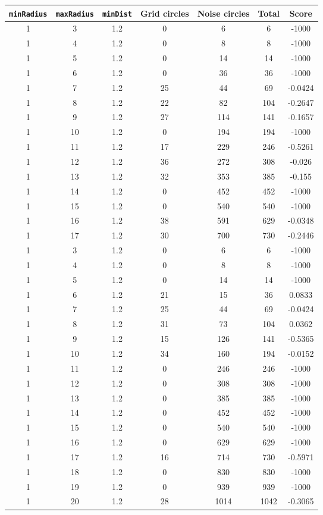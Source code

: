 \documentclass[letterpaper, 12pt]{article}
\begin{document}
\begin{longtable}{|c|c|c|c|c|c|c|}
\hline
\textbf{\texttt{minRadius}} & \textbf{\texttt{maxRadius}} & \textbf{\texttt{minDist}} & \textbf{Grid circles} & \textbf{Noise circles} & \textbf{Total} & \textbf{Score} \\
\hline
1 & 3 & 1.2 & 0 & 6 & 6 & -1000 \\
\hline
1 & 4 & 1.2 & 0 & 8 & 8 & -1000 \\
\hline
1 & 5 & 1.2 & 0 & 14 & 14 & -1000 \\
\hline
1 & 6 & 1.2 & 0 & 36 & 36 & -1000 \\
\hline
1 & 7 & 1.2 & 25 & 44 & 69 & -0.0424 \\
\hline
1 & 8 & 1.2 & 22 & 82 & 104 & -0.2647 \\
\hline
1 & 9 & 1.2 & 27 & 114 & 141 & -0.1657 \\
\hline
1 & 10 & 1.2 & 0 & 194 & 194 & -1000 \\
\hline
1 & 11 & 1.2 & 17 & 229 & 246 & -0.5261 \\
\hline
1 & 12 & 1.2 & 36 & 272 & 308 & -0.026 \\
\hline
1 & 13 & 1.2 & 32 & 353 & 385 & -0.155 \\
\hline
1 & 14 & 1.2 & 0 & 452 & 452 & -1000 \\
\hline
1 & 15 & 1.2 & 0 & 540 & 540 & -1000 \\
\hline
1 & 16 & 1.2 & 38 & 591 & 629 & -0.0348 \\
\hline
1 & 17 & 1.2 & 30 & 700 & 730 & -0.2446 \\
\hline
1 & 3 & 1.2 & 0 & 6 & 6 & -1000 \\
\hline
1 & 4 & 1.2 & 0 & 8 & 8 & -1000 \\
\hline
1 & 5 & 1.2 & 0 & 14 & 14 & -1000 \\
\hline
1 & 6 & 1.2 & 21 & 15 & 36 & 0.0833 \\
\hline
1 & 7 & 1.2 & 25 & 44 & 69 & -0.0424 \\
\hline
1 & 8 & 1.2 & 31 & 73 & 104 & 0.0362 \\
\hline
1 & 9 & 1.2 & 15 & 126 & 141 & -0.5365 \\
\hline
1 & 10 & 1.2 & 34 & 160 & 194 & -0.0152 \\
\hline
1 & 11 & 1.2 & 0 & 246 & 246 & -1000 \\
\hline
1 & 12 & 1.2 & 0 & 308 & 308 & -1000 \\
\hline
1 & 13 & 1.2 & 0 & 385 & 385 & -1000 \\
\hline
1 & 14 & 1.2 & 0 & 452 & 452 & -1000 \\
\hline
1 & 15 & 1.2 & 0 & 540 & 540 & -1000 \\
\hline
1 & 16 & 1.2 & 0 & 629 & 629 & -1000 \\
\hline
1 & 17 & 1.2 & 16 & 714 & 730 & -0.5971 \\
\hline
1 & 18 & 1.2 & 0 & 830 & 830 & -1000 \\
\hline
1 & 19 & 1.2 & 0 & 939 & 939 & -1000 \\
\hline
1 & 20 & 1.2 & 28 & 1014 & 1042 & -0.3065 \\
\hline
\end{longtable}
\end{document}
